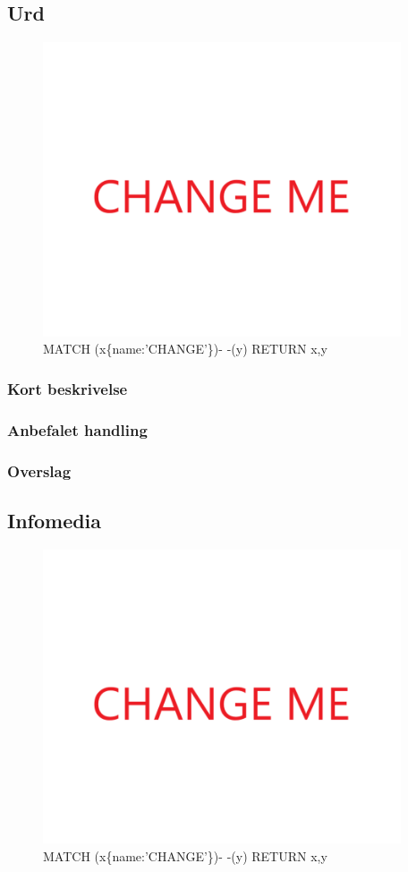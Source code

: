 \documentclass{article}
\begin{document}
\subsection{Urd}
\begin{figure}[h]
\includegraphics[width=300pt]{CHANGE.PNG}
\caption{MATCH (x\{name:'CHANGE'\})- -(y) RETURN x,y}
\end{figure}
\subsubsection{Kort beskrivelse}
\subsubsection{Anbefalet handling}
\subsubsection{Overslag}
\subsection{Infomedia}
\begin{figure}[h]
\includegraphics[width=300pt]{CHANGE.PNG}
\caption{MATCH (x\{name:'CHANGE'\})- -(y) RETURN x,y}
\end{figure}
\end{document}
